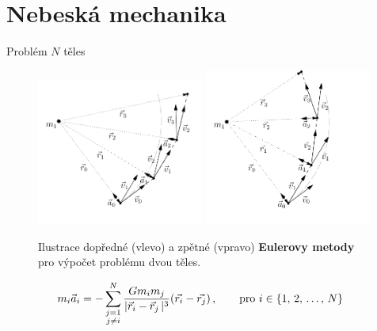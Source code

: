 \documentclass[xcolor=dvipsnames]{beamer}
\newcommand{\abs}[1]{\lvert #1 \,\rvert} %
\begin{document}
\section{Nebeská mechanika}


\begin{frame}[t]{\secname}{Problém $N$ těles}
	\begin{figure}
		\includegraphics[width=0.49\textwidth]{../asy/asteroidy-3.pdf}
		\includegraphics[width=0.49\textwidth]{../asy/asteroidy-4.pdf}
		\vspace{-1cm}
		\caption{\footnotesize{Ilustrace dopředné (vlevo) a zpětné (vpravo) \textbf{Eulerovy metody} pro výpočet problému dvou těles.}}
	\end{figure}
	\vspace{-0.5cm}
	\begin{align*}
		m_i\vec{a}_i &= -\sum_{\substack{j=1 \\ j\neq i}}^N \frac{Gm_im_j}{\abs{\vec{r}_i-\vec{r}_j}^3}(\vec{r_i}-\vec{r_j})\,, \qquad{\rm pro}\ i\in\{1,\,2,\,\dots,\,N\} \label{eq:nbody2}
	\end{align*}
\end{frame}
\end{document}
